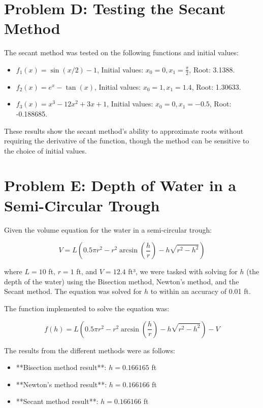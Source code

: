 \documentclass[a4paper]{article}
\begin{document}
\section*{Problem D: Testing the Secant Method}

The secant method was tested on the following functions and initial values:
\begin{itemize}
    \item \( f_1(x) = \sin(x / 2) - 1 \), Initial values: \( x_0 = 0, x_1 = \frac{\pi}{2} \), Root: 3.1388.
    \item \( f_2(x) = e^x - \tan(x) \), Initial values: \( x_0 = 1, x_1 = 1.4 \), Root: 1.30633.
    \item \( f_3(x) = x^3 - 12x^2 + 3x + 1 \), Initial values: \( x_0 = 0, x_1 = -0.5 \), Root: -0.188685.
\end{itemize}

These results show the secant method's ability to approximate roots without requiring the derivative of the function, though the method can be sensitive to the choice of initial values.

\section*{Problem E: Depth of Water in a Semi-Circular Trough}

Given the volume equation for the water in a semi-circular trough:

\[
V = L \left( 0.5\pi r^2 - r^2 \arcsin \left( \frac{h}{r} \right) - h \sqrt{r^2 - h^2} \right)
\]

where \( L = 10 \) ft, \( r = 1 \) ft, and \( V = 12.4 \) ft³, we were tasked with solving for \( h \) (the depth of the water) using the Bisection method, Newton's method, and the Secant method. The equation was solved for \( h \) to within an accuracy of 0.01 ft.

The function implemented to solve the equation was:

\[
f(h) = L \left( 0.5\pi r^2 - r^2 \arcsin \left( \frac{h}{r} \right) - h \sqrt{r^2 - h^2} \right) - V
\]

The results from the different methods were as follows:

\begin{itemize}
    \item **Bisection method result**: \( h = 0.166165 \) ft
    \item **Newton's method result**: \( h = 0.166166 \) ft
    \item **Secant method result**: \( h = 0.166166 \) ft
\end{itemize}
\end{document}
